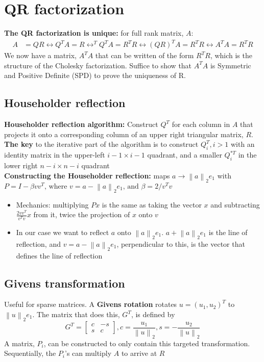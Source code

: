 \documentclass{article}
\newcommand{\norm}[2]{\left\lVert#1\right\rVert_#2}
\begin{document}
\section{QR factorization}
\textbf{The QR factorization is unique: } for full rank matrix, $A$:
\begin{align*}
    A &= QR \longleftrightarrow Q^TA = R \longleftrightarrow ^TQ^TA = R^TR \longleftrightarrow (QR)^TA = R^TR \longleftrightarrow A^TA = R^TR
\end{align*}
We now have a matrix, $A^TA$ that can be written of the form $R^TR$, which is the structure of the Cholesky factorization. Suffice to show that $A^TA$ is Symmetric and Positive Definite (SPD) to prove the uniqueness of R.

\subsection{Householder reflection}
\textbf{Householder reflection algorithm:} Construct $Q^T$ for each column in $A$ that projects it onto a corresponding column of an upper right triangular matrix, $R$. \textbf{The key} to the iterative part of the algorithm is to construct $Q_i^T, i > 1$ with an identity matrix in the upper-left $i-1 \times i-1$ quadrant, and a smaller $Q_i^{*T}$ in the lower right $n-i \times n-i$ quadrant\\
\textbf{Constructing the Householder reflection:} maps $a \rightarrow \norm{a}{2}e_1$ with $P = I - \beta vv^T \textrm{, where $v = a - \norm{a}{2}e_1$, and $\beta = 2/v^Tv$}$
\begin{itemize}
    \item Mechanics: multiplying $Px$ is the same as taking the vector $x$ and subtracting $\frac{2vv^T}{v^Tv}x$ from it, twice the projection of $x$ onto $v$
    \item In our case we want to reflect $a$ onto $\norm{a}{2}e_1$.  $a + \norm{a}{2}e_1$ is the line of reflection, and $v=a - \norm{a}{2}e_1$, perpendicular to this, is the vector that defines the line of reflection
\end{itemize}

\subsection{Givens transformation}
Useful for sparse matrices. A \textbf{Givens rotation} rotates $u = (u_1, u_2)^T$ to $\norm{u}{2}e_1$. The matrix that does this, $G^T$, is defined by
\begin{equation*}
    G^T = \begin{bmatrix} c & -s \\ s & c \end{bmatrix}, c = \frac{u_1}{\norm{u}{2}}, s = -\frac{u_2}{\norm{u}{2}}
\end{equation*}
A matrix, $P_i$, can be constructed to only contain this targeted transformation. Sequentially, the $P_i$'s can multiply $A$ to arrive at $R$
\end{document}
